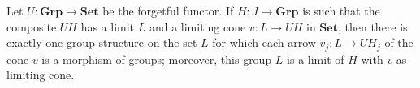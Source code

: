 Let $U : \mathbf{Grp} \to \mathbf{Set}$ be the forgetful functor. If $H : J \to \mathbf{Grp}$ is such that the composite $UH$ has a limit $L$ and a limiting cone $v : L \to UH$ in $\mathbf{Set}$, then there is exactly one group structure on the set $L$ for which each arrow $v_j : L \to UH_j$ of the cone $v$ is a morphism of groups; moreover, this group $L$ is a limit of $H$ with $v$ as limiting cone.
